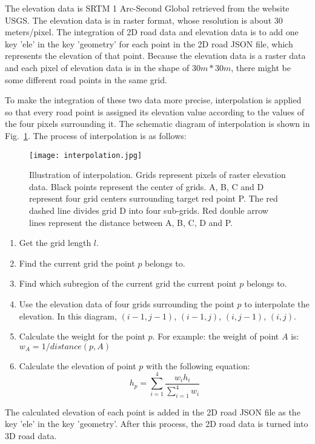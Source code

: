 \documentclass[final-report]{report-template}
\begin{document}
The elevation data is SRTM 1 Arc-Second Global retrieved from the website USGS. The elevation data is in raster format, whose resolution is about 30 meters/pixel. 
The integration of 2D road data and elevation data is to add one key 'ele' in the key 'geometry' for each point in the 2D road JSON file, which represents the elevation of that point. 
Because the elevation data is a raster data and each pixel of elevation data is in the shape of $30m*30m$, 
there might be some different road points in the same grid. 

To make the integration of these two data more precise, interpolation is applied so that every road point is assigned its elevation value according to the values of the four pixels surrounding it.
The schematic diagram of interpolation is shown in Fig.~\ref{fig:interpolation}. The process of interpolation is as follows:
\begin{figure}[H]
    \centering
    \texttt{[image: interpolation.jpg]}
    \caption{Illustration of interpolation. Grids represent pixels of raster elevation data. Black points represent the center of grids. A, B, C and D represent four grid centers surrounding target red point P. The red dashed line divides grid D into four sub-grids. Red double arrow lines represent the distance between A, B, C, D and P.}
    \label{fig:interpolation}
\end{figure}

\begin{enumerate}
    \item Get the grid length $l$.
    \item Find the current grid the point $p$ belongs to.
    \item Find which subregion of the current grid the current point $p$ belongs to.
    \item Use the elevation data of four grids surrounding the point $p$ to interpolate the elevation. In this diagram, $(i-1,j-1)$, $(i-1,j)$, $(i,j-1)$, $(i,j)$.
    \item Calculate the weight for the point $p$. For example: the weight of point $A$ is: $w_A = 1/distance(p, A)$
    \item Calculate the elevation of point $p$ with the following equation:
    \begin{equation}
        h_p = \sum_{i=1}^{4}\frac{w_i h_i}{\sum_{i=1}^{4} w_i}
    \end{equation}
\end{enumerate}

The calculated elevation of each point is added in the 2D road JSON file as the key 'ele' in the key 'geometry'.
After this process, the 2D road data is turned into 3D road data.
\end{document}
